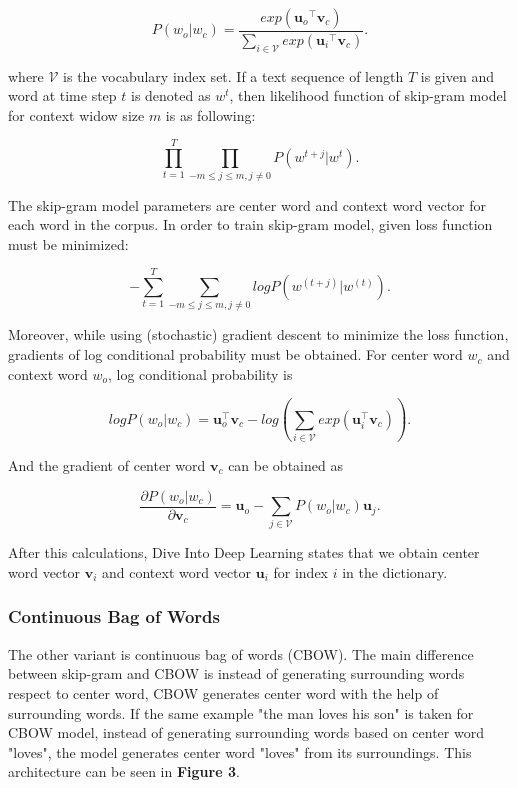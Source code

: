 \documentclass[man]{apa7}
\begin{document}
\begin{equation}
P(w_o | w_c) = \frac{exp(\mathbf{u_\mathit{o}}^\top \mathbf{v_\mathit{c}})}{\sum_{i \in \mathcal{V}} exp(\mathbf{u_\mathit{i}}^\top \mathbf{v_\mathit{c}})}.
\end{equation}

where $ \mathcal{V}$ is the vocabulary index set. If a text sequence of length $T$ is given and word at time step $t$ is denoted as $\mathit{w}^t$, then likelihood function of skip-gram model for context widow size $m$ is as following:

\begin{equation}
\prod_{t=1}^T \prod_{-m \le j \le m , j \neq 0} P(w^{t+j} | w^t).
\end{equation}

The skip-gram model parameters are center word and context word vector for each word in the corpus. In order to train skip-gram model, given loss function must be minimized:

$$ -\sum_{t=1}^T \sum_{-m \le j \le m, j \neq 0} logP(w^{(t+j)} | w^{(t)}).$$

Moreover, while using (stochastic) gradient descent to minimize the loss function, gradients of log conditional probability must be obtained. For center word $w_c$ and context word $w_o$, log conditional probability is

\begin{equation}
logP(w_o|w_c) = \mathbf{u}_o^\top \mathbf{v}_c - log(\sum_{i \in \mathcal{V}} exp(\mathbf{u}_i^\top \mathbf{v}_c)).
\end{equation}

And the gradient of center word $\mathbf{v}_c$ can be obtained as

\begin{equation}
\frac{\partial P(w_o | w_c)}{\partial \mathbf{v}_c} = \mathbf{u}_o - \sum_{j \in \mathcal{V}} P(w_o|w_c)\mathbf{u}_j.
\end{equation}

After this calculations, Dive Into Deep Learning states that we obtain center word vector $\mathbf{v}_i$ and context word vector $\mathbf{u}_i$ for index $i$ in the dictionary.

\subsubsection{Continuous Bag of Words}

The other variant is continuous bag of words (CBOW). The main difference between skip-gram and CBOW is instead of generating surrounding words respect to center word, CBOW generates center word with the help of surrounding words. If the same example "the man loves his son" is taken for CBOW model, instead of generating surrounding words based on center word "loves", the model generates center word "loves" from its surroundings. This architecture can be seen in \textbf{Figure 3}.
\\[2\baselineskip]
\end{document}
